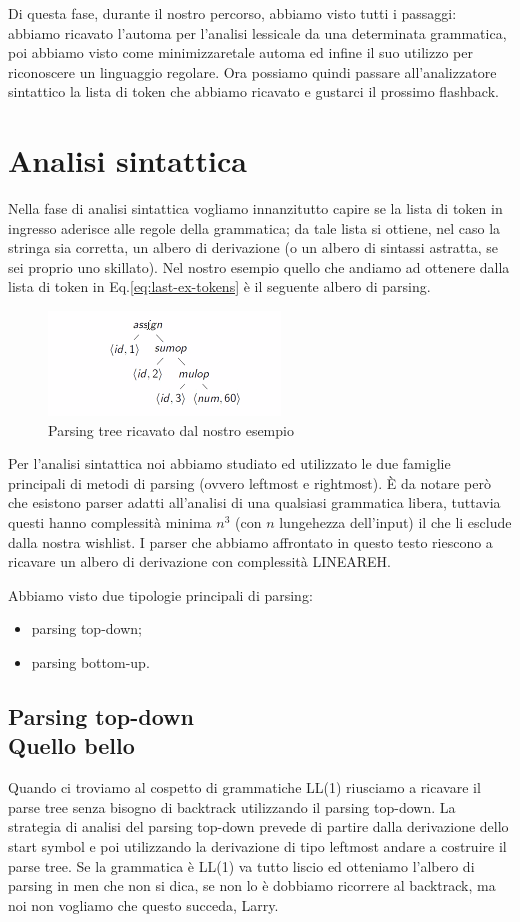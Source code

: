 \documentclass[class=book, crop=false, oneside, 12pt]{standalone}
\begin{document}
Di questa fase, durante il nostro percorso, abbiamo visto tutti i passaggi: abbiamo ricavato l'automa per l'analisi lessicale da una determinata grammatica, poi abbiamo visto come minimizzaretale automa ed infine il suo utilizzo per riconoscere un linguaggio regolare.
Ora possiamo quindi passare all'analizzatore sintattico la lista di token che abbiamo ricavato e gustarci il prossimo flashback. 

\section{Analisi sintattica}
Nella fase di analisi sintattica vogliamo innanzitutto capire se la lista di token in ingresso aderisce alle regole della grammatica; da tale lista si ottiene, nel caso la stringa sia corretta, un albero di derivazione (o un albero di sintassi astratta, se sei proprio uno skillato).
Nel nostro esempio quello che andiamo ad ottenere dalla lista di token in Eq.\ref{eq:last-ex-tokens} è il seguente albero di parsing.
\begin{figure}[H]
    \centering
    \includegraphics[width=.4\textwidth]{final-example-parsing-tree.png}
    \caption{Parsing tree ricavato dal nostro esempio}
    \label{fig:last-ex-parse-tree}
\end{figure}
Per l'analisi sintattica noi abbiamo studiato ed utilizzato le due famiglie principali di metodi di parsing (ovvero leftmost e rightmost). 
È da notare però che esistono parser adatti all'analisi di una qualsiasi grammatica libera, tuttavia questi hanno complessità minima \(n^3\) (con \(n\) lungehezza dell'input) il che li esclude dalla nostra wishlist.
I parser che abbiamo affrontato in questo testo riescono a ricavare un albero di derivazione con complessità LINEAREH.

Abbiamo visto due tipologie principali di parsing:
\begin{itemize}
    \item parsing top-down;
    \item parsing bottom-up.
\end{itemize} 

\subsection{Parsing top-down\\ \small{Quello bello}}
Quando ci troviamo al cospetto di grammatiche LL(1) riusciamo a ricavare il parse tree senza bisogno di backtrack utilizzando il parsing top-down.
La strategia di analisi del parsing top-down prevede di partire dalla derivazione dello start symbol e poi utilizzando la derivazione di tipo leftmost andare a costruire il parse tree.
Se la grammatica è LL(1) va tutto liscio ed otteniamo l'albero di parsing in men che non si dica, se non lo è dobbiamo ricorrere al backtrack, ma noi non vogliamo che questo succeda, Larry.
\end{document}

